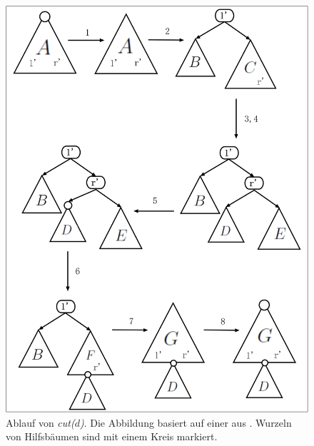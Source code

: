 \documentclass[a4paper,12pt]{article}
\begin{document}
\begin{figure}[H]
	\centering
	\includegraphics[width=1\textwidth]{"Medien/Tango/cut"}
	\caption{Ablauf von \textit{cut($d$)}. Die Abbildung basiert auf einer aus \cite{demainDinamicOpti}. Wurzeln von Hilfsbäumen sind mit einem Kreis markiert. }
	\label{fig:cut}
\end{figure}
\end{document}
